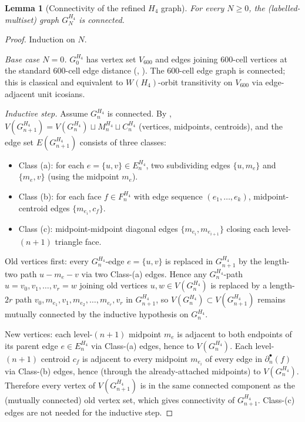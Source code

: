 \documentclass[11pt]{article}
\newtheorem{lemma}[theorem]{Lemma}
\theoremstyle{definition}
\begin{document}
\begin{lemma}[Connectivity of the refined $H_4$ graph]
\label{lem:connected}
For every $N \geq 0$, the (labelled-multiset) graph $G_N^{H_4}$
is connected.
\end{lemma}

\begin{proof}
Induction on $N$.

\emph{Base case $N = 0$.} $G_0^{H_4}$ has vertex set $V_{600}$
and edges joining $600$-cell vertices at the standard $600$-cell
edge distance
(\cite[Definition~\texttt{def:base-graphs}]{RefinementSpaces},
\cite[\S 22.7]{CoxeterRegularPolytopes}). The $600$-cell edge
graph is connected; this is classical and equivalent to
$W(H_4)$-orbit transitivity on $V_{600}$ via edge-adjacent unit
icosians.

\emph{Inductive step.} Assume $G_n^{H_4}$ is connected. By
\cite[Definition~\texttt{def:refinement}]{RefinementSpaces},
$V(G_{n+1}^{H_4}) = V(G_n^{H_4}) \sqcup M_n^{H_4} \sqcup
C_n^{H_4}$ (vertices, midpoints, centroids), and the edge set
$E(G_{n+1}^{H_4})$ consists of three classes:
\begin{itemize}[leftmargin=2em]
\item Class (a): for each $e = \{u, v\} \in E_n^{H_4}$, two
  subdividing edges $\{u, m_e\}$ and $\{m_e, v\}$ (using the
  midpoint $m_e$).
\item Class (b): for each face $f \in F_n^{H_4}$ with edge
  sequence $(e_1, \ldots, e_k)$, midpoint-centroid edges
  $\{m_{e_i}, c_f\}$.
\item Class (c): midpoint-midpoint diagonal edges
  $\{m_{e_i}, m_{e_{i+1}}\}$ closing each level-$(n+1)$ triangle
  face.
\end{itemize}
Old vertices first: every $G_n^{H_4}$-edge $e = \{u, v\}$ is
replaced in $G_{n+1}^{H_4}$ by the length-two path
$u - m_e - v$ via two Class-(a) edges. Hence any $G_n^{H_4}$-path
$u = v_0, v_1, \ldots, v_r = w$ joining old vertices $u, w \in
V(G_n^{H_4})$ is replaced by a length-$2r$ path $v_0, m_{e_1},
v_1, m_{e_2}, \ldots, m_{e_r}, v_r$ in $G_{n+1}^{H_4}$, so
$V(G_n^{H_4}) \subset V(G_{n+1}^{H_4})$ remains mutually
connected by the inductive hypothesis on $G_n^{H_4}$.

New vertices: each level-$(n+1)$ midpoint $m_e$ is adjacent to
both endpoints of its parent edge $e \in E_n^{H_4}$ via Class-(a)
edges, hence to $V(G_n^{H_4})$. Each level-$(n+1)$ centroid
$c_f$ is adjacent to every midpoint $m_{e_i}$ of every edge in
$\partial^\bullet_n(f)$ via Class-(b) edges, hence (through the
already-attached midpoints) to $V(G_n^{H_4})$. Therefore every
vertex of $V(G_{n+1}^{H_4})$ is in the same connected component
as the (mutually connected) old vertex set, which gives connectivity
of $G_{n+1}^{H_4}$. Class-(c) edges are not needed for the
inductive step.
\end{proof}
\end{document}
